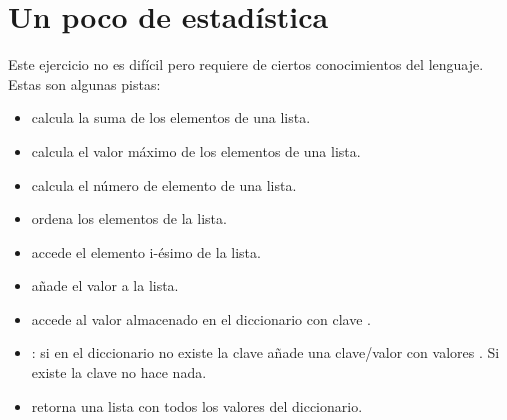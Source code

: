 %
%
%
%





\separacion
\section{Un poco de estadística} \label{sec:estadistica}

Este ejercicio no es difícil pero requiere de ciertos conocimientos del lenguaje. Estas son algunas pistas:
\begin{itemize}
\item {} calcula la suma de los elementos de una lista.
\item {} calcula el valor  máximo de los elementos de una lista.
\item {} calcula el número de  elemento de una lista.
\item {} ordena los elementos de la lista.
\item {} accede el elemento i-ésimo de la lista. 
\item {} añade el valor  a la lista.
\item {} accede al valor almacenado en el diccionario con clave .
\item {}: si en el diccionario no existe la clave  añade una clave/valor con valores . Si existe la clave  no hace nada.
\item {} retorna una lista con todos los valores del diccionario.
\end{itemize}


